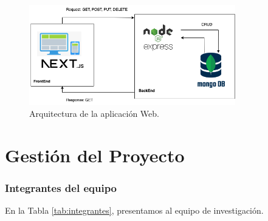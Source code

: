 \documentclass[a4paper]{article}
\begin{document}
\begin{figure}[H]
	\centering
	\includegraphics[width=0.8\textwidth]{img/neoantigen/arquitectura.png}
	\caption{Arquitectura de la aplicación Web.}
	\label{fig:arquitectura}
\end{figure}


	
	
	

\clearpage


\part*{Gestión del Proyecto}

\setcounter{section}{0}


\section{Integrantes del equipo}
En la Tabla \ref{tab:integrantes}, presentamos al equipo de investigación.
\end{document}
